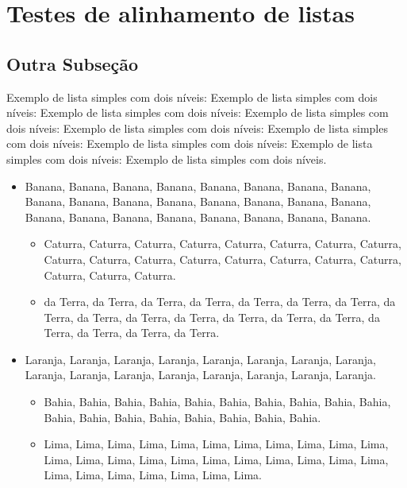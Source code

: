 \chapter{Testes de alinhamento de listas}


\section{Outra Subseção}

Exemplo de lista simples com dois níveis: Exemplo de lista simples com dois níveis: Exemplo de lista simples com dois níveis: Exemplo de lista simples com dois níveis: Exemplo de lista simples com dois níveis: Exemplo de lista simples com dois níveis: Exemplo de lista simples com dois níveis: Exemplo de lista simples com dois níveis: Exemplo de lista simples com dois níveis.

\begin{itemize}

\item Banana, Banana, Banana, Banana, Banana, Banana, Banana, Banana, Banana, Banana, Banana, Banana, Banana, Banana, Banana, Banana, Banana, Banana, Banana, Banana, Banana, Banana, Banana, Banana.

\begin{itemize}

\item Caturra, Caturra, Caturra, Caturra, Caturra, Caturra, Caturra, Caturra, Caturra, Caturra, Caturra, Caturra, Caturra, Caturra, Caturra, Caturra, Caturra, Caturra, Caturra.

\item da Terra, da Terra, da Terra, da Terra, da Terra, da Terra, da Terra, da Terra, da Terra, da Terra, da Terra, da Terra, da Terra, da Terra, da Terra, da Terra, da Terra, da Terra.

\end{itemize}

\item Laranja, Laranja, Laranja, Laranja, Laranja, Laranja, Laranja, Laranja, Laranja, Laranja, Laranja, Laranja, Laranja, Laranja, Laranja, Laranja.

\begin{itemize}

\item Bahia, Bahia, Bahia, Bahia, Bahia, Bahia, Bahia, Bahia, Bahia, Bahia, Bahia, Bahia, Bahia, Bahia, Bahia, Bahia, Bahia, Bahia.

\item Lima, Lima, Lima, Lima, Lima, Lima, Lima, Lima, Lima, Lima, Lima, Lima, Lima, Lima, Lima, Lima, Lima, Lima, Lima, Lima, Lima, Lima, Lima, Lima, Lima, Lima, Lima, Lima, Lima.

\end{itemize}

\end{itemize}


